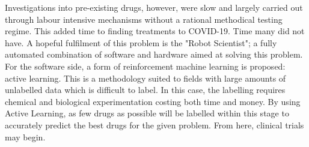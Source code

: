 Investigations into pre-existing drugs, however, were slow and largely carried out through labour intensive mechanisms without a rational methodical testing regime. This added time to finding treatments to \mbox{COVID-19}. Time many did not have. A hopeful fulfilment of this problem is the "Robot Scientist"; a fully automated combination of software and hardware aimed at solving this problem. For the software side, a form of reinforcement machine learning is proposed: active learning. This is a methodology suited to fields with large amounts of unlabelled data which is difficult to label. In this case, the labelling requires chemical and biological experimentation costing both time and money. By using Active Learning, as few drugs as possible will be labelled within this stage to accurately predict the best drugs for the given problem. From here, clinical trials may begin.

